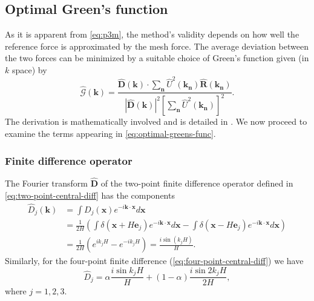 \subsection{Optimal Green's function}
As it is apparent from \autoref{eq:p3m}, the method's validity depends on how well the reference force is approximated by the mesh force.
The average deviation between the two forces can be minimized by a suitable choice of Green's function given (in $k$ space) by
\begin{equation}\label{eq:optimal-greens-func}
    \hat{\mathcal{G}}(\mathbf{k}) = \frac{\mathbf{\hat{D}}(\mathbf{k}) \cdot \sum_{\mathbf{n}}\hat{U}^2(\mathbf{k_\mathbf{n}}) \mathbf{\hat{R}}(\mathbf{k}_\mathbf{n})}{|\mathbf{\hat{D}}(\mathbf{k})|^2 \left[ \sum_{\mathbf{n}}\hat{U}^2(\mathbf{k}_\mathbf{n}) \right]^2}.
\end{equation}
The derivation is mathematically involved and is detailed in \cite{Hockney1988}.
We now proceed to examine the terms appearing in \autoref{eq:optimal-greens-func}.

\subsubsection{Finite difference operator}
The Fourier transform $\mathbf{\hat{D}}$ of the two-point finite difference operator defined in \autoref{eq:two-point-central-diff} has the components
\begin{align*}
    \hat{D}_j(\mathbf{k})
     & = \int D_j(\mathbf{x}) e^{-i\mathbf{k}\cdot \mathbf{x}} d\mathbf{x}                                                                                                                                      \\
     & = \frac{1}{2H}\left( \int \delta(\mathbf{x} + H\mathbf{e}_j)e^{-i \mathbf{k}\cdot \mathbf{x}} d\mathbf{x} - \int \delta(\mathbf{x} - H\mathbf{e}_j)e^{-i \mathbf{k}\cdot \mathbf{x}} d\mathbf{x} \right) \\
     & = \frac{1}{2H} (e^{ik_j H} - e^{-ik_j H})
    = \frac{i \sin(k_j H)}{H}.
\end{align*}
Similarly, for the four-point finite difference (\autoref{eq:four-point-central-diff}) we have
\begin{equation*}
    \hat{D}_j = \alpha\frac{i\sin k_j H}{H} + (1- \alpha)\frac{i\sin 2k_j H}{2H},
\end{equation*}
where $j=1,2,3$.

